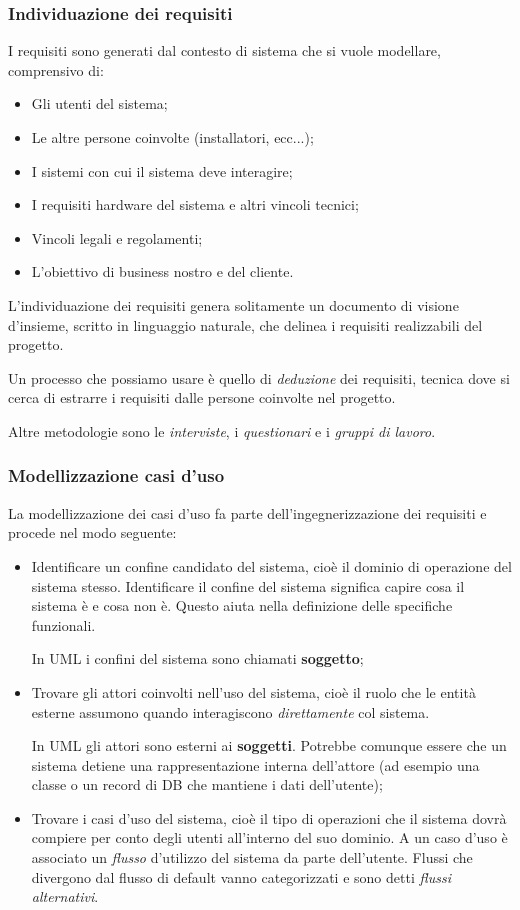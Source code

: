\documentclass[a4paper,11pt]{article}
\begin{document}
\subsubsection{Individuazione dei requisiti}
I requisiti sono generati dal contesto di sistema che si vuole modellare, comprensivo di:
\begin{itemize}
	\item Gli utenti del sistema;
	\item Le altre persone coinvolte (installatori, ecc...);
	\item I sistemi con cui il sistema deve interagire; 
	\item I requisiti hardware del sistema e altri vincoli tecnici;
	\item Vincoli legali e regolamenti;
	\item L'obiettivo di business nostro e del cliente.
\end{itemize}

L'individuazione dei requisiti genera solitamente un documento di visione d'insieme, scritto in linguaggio naturale, che delinea i requisiti realizzabili del progetto.

Un processo che possiamo usare è quello di \textit{deduzione} dei requisiti, tecnica dove si cerca di estrarre i requisiti dalle persone coinvolte nel progetto.

Altre metodologie sono le \textit{interviste}, i \textit{questionari} e i \textit{gruppi di lavoro}.

\subsubsection{Modellizzazione casi d'uso}
La modellizzazione dei casi d'uso fa parte dell'ingegnerizzazione dei requisiti e procede nel modo seguente:
\begin{itemize}
	\item Identificare un confine candidato del sistema, cioè il dominio di operazione del sistema stesso. Identificare il confine del sistema significa capire cosa il sistema è e cosa non è. Questo aiuta nella definizione delle specifiche funzionali.

		In UML i confini del sistema sono chiamati \textbf{soggetto};
	\item Trovare gli attori coinvolti nell'uso del sistema, cioè il ruolo che le entità esterne assumono quando interagiscono \textit{direttamente} col sistema.

		In UML gli attori sono esterni ai \textbf{soggetti}. Potrebbe comunque essere che un sistema detiene una rappresentazione interna dell'attore (ad esempio una classe o un record di DB che mantiene i dati dell'utente);
	\item Trovare i casi d'uso del sistema, cioè il tipo di operazioni che il sistema dovrà compiere per conto degli utenti all'interno del suo dominio. A un caso d'uso è associato un \textit{flusso} d'utilizzo del sistema da parte dell'utente. Flussi che divergono dal flusso di default vanno categorizzati e sono detti \textit{flussi alternativi}.
\end{itemize}
\end{document}
